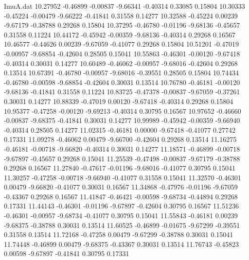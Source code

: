 \begin{filecontents}{ImuA.dat}
  10.27952   -0.46899   -0.00837   -9.66341   -0.40314    0.33085    0.15804
  10.30333   -0.45224   -0.00479   -9.66222   -0.41841    0.31558    0.14277
  10.32588   -0.45224    0.00239   -9.67179   -0.38788    0.29268    0.15804
  10.37295   -0.46780   -0.01196   -9.68136   -0.45657    0.31558    0.11224
  10.44172   -0.45942   -0.00359   -9.68136   -0.40314    0.29268    0.16567
  10.46577   -0.44626    0.00239   -9.67059   -0.41077    0.29268    0.15804
  10.51201   -0.47019   -0.00957   -9.68854   -0.42604    0.28505    0.15041
  10.55863   -0.46301   -0.00120   -9.67418   -0.40314    0.30031    0.14277
  10.60489   -0.46062   -0.00957   -9.68016   -0.42604    0.29268    0.13514
  10.67391   -0.46780   -0.00957   -9.68016   -0.39551    0.28505    0.15804
  10.74434   -0.46780   -0.00598   -9.68854   -0.42604    0.30031    0.13514
  10.76780   -0.46181   -0.00120   -9.68136   -0.41841    0.31558    0.11224
  10.83725   -0.47378   -0.00837   -9.67059   -0.37261    0.30031    0.14277
  10.88339   -0.47019    0.00120   -9.67418   -0.40314    0.29268    0.15804
  10.95377   -0.47258   -0.00120   -9.69213   -0.40314    0.30795    0.16567
  10.97652   -0.46660   -0.00837   -9.68375   -0.41841    0.30031    0.14277
  10.99989   -0.45942   -0.00359   -9.66940   -0.40314    0.28505    0.14277
  11.02315   -0.46181    0.00000   -9.67418   -0.41077    0.27742    0.17331
  11.09278   -0.46062    0.00479   -9.66700   -0.42604    0.29268    0.13514
  11.16275   -0.46181   -0.00718   -9.66820   -0.40314    0.30031    0.14277
  11.18571   -0.46899   -0.00718   -9.67897   -0.45657    0.29268    0.15041
  11.25539   -0.47498   -0.00837   -9.67179   -0.38788    0.29268    0.16567
  11.27840   -0.47617   -0.01196   -9.68016   -0.41077    0.30795    0.15041
  11.30257   -0.47258   -0.00718   -9.66940   -0.41077    0.31558    0.15041
  11.32570   -0.46301    0.00479   -9.66820   -0.41077    0.30031    0.16567
  11.34868   -0.47976   -0.01196   -9.67059   -0.43367    0.29268    0.16567
  11.41847   -0.46421   -0.00598   -9.68734   -0.44894    0.29268    0.17331
  11.44143   -0.46301   -0.01196   -9.67897   -0.42604    0.30795    0.16567
  11.51236   -0.46301   -0.00957   -9.68734   -0.41077    0.30795    0.15041
  11.55843   -0.46181    0.00239   -9.68375   -0.38788    0.30031    0.13514
  11.60525   -0.46899   -0.01675   -9.67299   -0.39551    0.31558    0.13514
  11.72168   -0.47258    0.00479   -9.67299   -0.38788    0.30031    0.15041
  11.74448   -0.46899    0.00479   -9.68375   -0.43367    0.30031    0.13514
  11.76743   -0.45823    0.00598   -9.67897   -0.41841    0.30795    0.17331

\end{filecontents}
